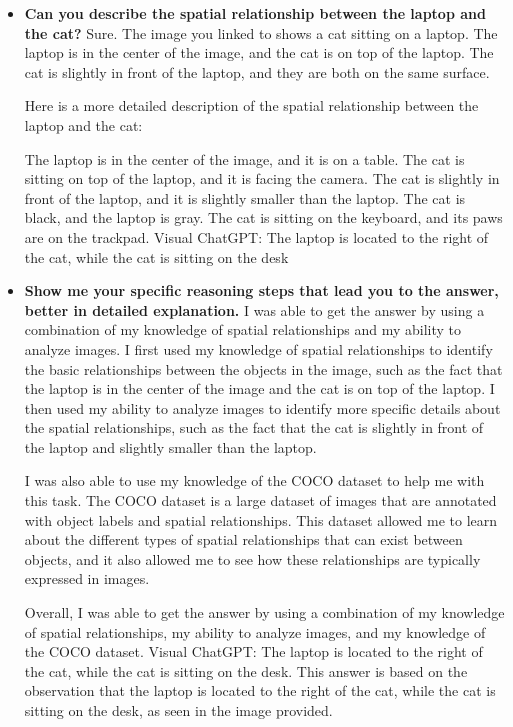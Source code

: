     \begin{itemize}
        \item \textbf{Can you describe the spatial relationship between the laptop and the cat?}
        \subitem Sure. The image you linked to shows a cat sitting on a laptop. The laptop is in the center of the image, and the cat is on top of the laptop. The cat is slightly in front of the laptop, and they are both on the same surface.

        Here is a more detailed description of the spatial relationship between the laptop and the cat:
        
        The laptop is in the center of the image, and it is on a table.
        The cat is sitting on top of the laptop, and it is facing the camera.
        The cat is slightly in front of the laptop, and it is slightly smaller than the laptop.
        The cat is black, and the laptop is gray.
        The cat is sitting on the keyboard, and its paws are on the trackpad.
        \subitem Visual ChatGPT: The laptop is located to the right of the cat, while the cat is sitting on the desk
        \item \textbf{Show me your specific reasoning steps that lead you to the answer, better in detailed explanation.}
        \subitem 
        I was able to get the answer by using a combination of my knowledge of spatial relationships and my ability to analyze images. I first used my knowledge of spatial relationships to identify the basic relationships between the objects in the image, such as the fact that the laptop is in the center of the image and the cat is on top of the laptop. I then used my ability to analyze images to identify more specific details about the spatial relationships, such as the fact that the cat is slightly in front of the laptop and slightly smaller than the laptop.
        
        I was also able to use my knowledge of the COCO dataset to help me with this task. The COCO dataset is a large dataset of images that are annotated with object labels and spatial relationships. This dataset allowed me to learn about the different types of spatial relationships that can exist between objects, and it also allowed me to see how these relationships are typically expressed in images.
        
        Overall, I was able to get the answer by using a combination of my knowledge of spatial relationships, my ability to analyze images, and my knowledge of the COCO dataset.
        \subitem Visual ChatGPT: The laptop is located to the right of the cat, while the cat is sitting on the desk. This answer is based on the observation that the laptop is located to the right of the cat, while the cat is sitting on the desk, as seen in the image provided.
    \end{itemize}
